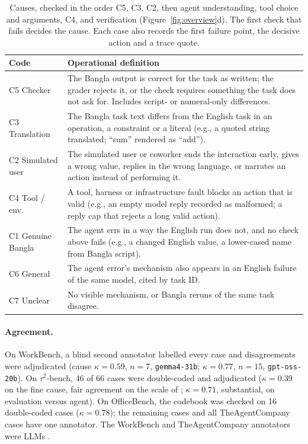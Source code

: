 \documentclass[11pt]{article}
\newif\ifshowverify
\newcommand{\verify}[1]{\ifshowverify{\color{red}\,[VERIFY: #1]}\fi}
\newcommand{\gemma}{\texttt{gemma4-31b}}
\newcommand{\gptoss}{\texttt{gpt-oss-20b}}
\newcommand{\OB}{OfficeBench}
\newcommand{\WB}{WorkBench}
\newcommand{\TAU}{$\tau^2$-bench}
\newcommand{\TAC}{TheAgentCompany}
\begin{document}
\begin{table}[h]
\centering\footnotesize
\begin{tabular}{L{1.5cm}L{5.25cm}}
\toprule
Code & Operational definition \\
\midrule
C5 Checker & The Bangla output is correct for the task as written; the grader rejects it, or the check
requires something the task does not ask for. Includes script- or numeral-only differences. \\
C3 Translation & The Bangla task text differs from the English task in an operation, a constraint or a
literal (e.g., a quoted string translated; ``sum'' rendered as ``add''). \\
C2 Simulated user & The simulated user or coworker ends the interaction early, gives a wrong value,
replies in the wrong language, or narrates an action instead of performing it. \\
C4 Tool / env. & A tool, harness or infrastructure fault blocks an action that is valid (e.g., an
empty model reply recorded as malformed; a reply cap that rejects a long valid action). \\
C1 Genuine Bangla & The agent errs in a way the English run does not, and no check above fails
(e.g., a changed English value, a lower-cased name from Bangla script). \\
C6 General & The agent error's mechanism also appears in an English failure of the same model, cited
by task ID. \\
C7 Unclear & No visible mechanism, or Bangla reruns of the same task disagree. \\
\bottomrule
\end{tabular}
\caption{Causes, checked in the order C5, C3, C2, then agent understanding, tool choice and
arguments, C4, and verification (Figure~\ref{fig:overview}d). The first check that fails decides
the cause. Each case also records the first failure point, the decisive action and a trace quote.}
\label{tab:codebook}
\end{table}

\paragraph{Agreement.} On \WB{}, a blind second annotator labelled every case and
disagreements were adjudicated (cause $\kappa=0.59$, $n=7$, \gemma{}; $\kappa=0.77$, $n=15$,
\gptoss{}). On \TAU{}, 46 of 66 cases were double-coded and adjudicated ($\kappa=0.39$ on the
fine cause, fair agreement on the scale of \citealp{landis1977}; $\kappa=0.71$, substantial, on
evaluation versus agent). On \OB{}, the codebook was checked on 16 double-coded cases
($\kappa=0.78$); the remaining cases and all \TAC{} cases have one annotator. The \WB{} and
\TAC{} annotators were LLMs \verify{annotator identity for \OB{} and \TAU{}; the draft's
$\kappa$ range 0.39--0.63 includes a value not found in the sources}.
\end{document}
